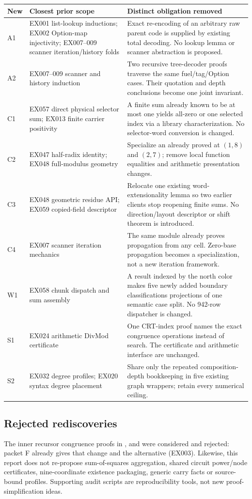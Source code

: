{\small
\begin{tabularx}{\linewidth}{@{}L{0.42in}L{2.0in}Y@{}}
\toprule
New & Closest prior scope & Distinct obligation removed\\
\midrule
A1 & EX001 list-lookup inductions; EX002 Option-map injectivity; EX007--009 scanner iteration/history folds & Exact re-encoding of an arbitrary raw parent code is supplied by existing total decoding. No lookup lemma or scanner abstraction is proposed.\\
A2 & EX007--009 scanner and history induction & Two recursive tree-decoder proofs traverse the same fuel/tag/Option cases. Their quotation and depth conclusions become one joint invariant.\\
C1 & EX057 direct physical selector sum; EX013 finite carrier positivity & A finite sum already known to be at most one yields all-zero or one selected index via a library characterization. No selector-word conversion is changed.\\
C2 & EX047 half-radix identity; EX048 full-modulus geometry & Specialize an already proved  at $(1,8)$ and $(2,7)$; remove local function equalities and arithmetic presentation changes.\\
C3 & EX048 geometric residue API; EX059 copied-field descriptor & Relocate one existing word-extensionality lemma so two earlier clients stop reopening finite sums. No direction/layout descriptor or shift theorem is introduced.\\
C4 & EX007 scanner iteration mechanics & The same module already proves propagation from any cell. Zero-base propagation becomes a specialization, not a new iteration framework.\\
W1 & EX058 chunk dispatch and sum assembly & A result indexed by the north color makes five newly added boundary classifications projections of one semantic case split. No 942-row dispatcher is changed.\\
S1 & EX024 arithmetic DivMod certificate & One CRT-index proof names the exact congruence operations instead of search. The certificate and arithmetic interface are unchanged.\\
S2 & EX032 degree profiles; EX020 syntax degree placement & Share only the repeated  composition-depth bookkeeping in five existing graph wrappers; retain every numerical ceiling.\\
\bottomrule
\end{tabularx}}

\subsection{Rejected rediscoveries}

The inner recursor congruence proofs in ,
 and 
were considered and rejected: packet F already gives that change and the
 alternative (EX003). Likewise, this report does
not re-propose sum-of-squares aggregation, shared circuit power/node
certificates, nine-coordinate existence packaging, generic carry facts or
source-bound profiles. Supporting audit scripts are reproducibility tools,
not new proof-simplification ideas.
